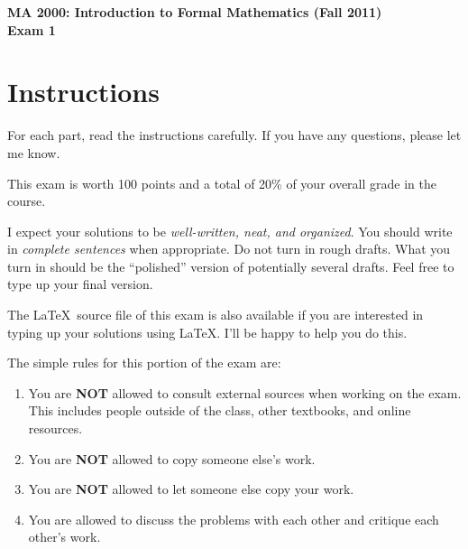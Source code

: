 \documentclass[11pt]{article}
\theoremstyle{definition}
\begin{document}
\begin{center}

{\Large\bf MA 2000: Introduction to Formal Mathematics (Fall 2011)}\\
\smallskip
{\Large\bf Exam 1}

\setlength{\fboxsep}{10pt}

\bigskip

  
  \bigskip
  


\end{center}

\section*{Instructions}

For each part, read the instructions carefully.  If you have any questions, please let me know.

\bigskip

This exam is worth 100 points and a total of 20\% of your overall grade in the course.

\bigskip

I expect your solutions to be \emph{well-written, neat, and organized}.  You should write in \emph{complete sentences} when appropriate.  Do not turn in rough drafts.  What you turn in should be the ``polished'' version of potentially several drafts.  Feel free to type up your final version.  

\bigskip

The \LaTeX\ source file of this exam is also available if you are interested in typing up your solutions using \LaTeX.  I'll be happy to help you do this.

\bigskip

The simple rules for this portion of the exam are:

\begin{enumerate}
\item You are \textbf{NOT} allowed to consult external sources when working on the exam.  This includes people outside of the class, other textbooks, and online resources.
\item You are \textbf{NOT} allowed to copy someone else's work.
\item You are \textbf{NOT} allowed to let someone else copy your work.
\item You are allowed to discuss the problems with each other and critique each other's work.
\end{enumerate}
\end{document}
